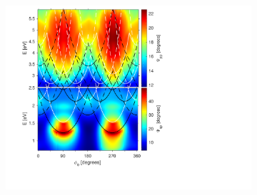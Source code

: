 \begin{figure}[h]  %
    \begin{subfigure}{\textwidth}
        \centering
        \includegraphics[width=0.5\linewidth, trim=1.2cm  1.8cm 6.5cm 0.3cm, clip]{figures/ch4/S5B/exp/S5B_Psi_pp_exp_55.pdf}
        \caption{}
        \label{fig:S5B_contour_Psipp_exp}
    \end{subfigure}
    

\end{figure}
